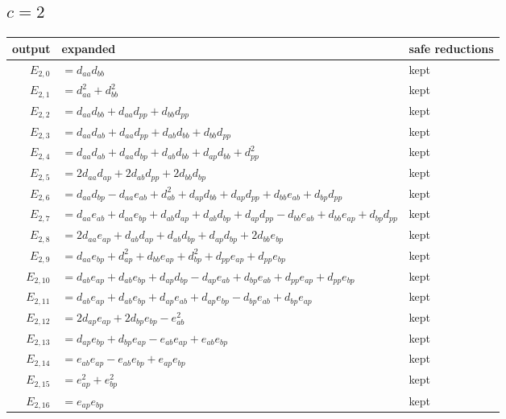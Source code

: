 \documentclass[10pt]{article}
\begin{document}
\subsection*{$c = 2$}
\begin{longtable}{r>{\raggedright\arraybackslash}p{}>{\raggedright\arraybackslash}p{}}
output & expanded & safe reductions \\ \hline
$E_{2,0}$ & $= d_{aa} d_{bb}$ & kept \\
$E_{2,1}$ & $= d_{aa}^{2} + d_{bb}^{2}$ & kept \\
$E_{2,2}$ & $= d_{aa} d_{bb} + d_{aa} d_{pp} + d_{bb} d_{pp}$ & kept \\
$E_{2,3}$ & $= d_{aa} d_{ab} + d_{aa} d_{pp} + d_{ab} d_{bb} + d_{bb} d_{pp}$ & kept \\
$E_{2,4}$ & $= d_{aa} d_{ab} + d_{aa} d_{bp} + d_{ab} d_{bb} + d_{ap} d_{bb} + d_{pp}^{2}$ & kept \\
$E_{2,5}$ & $= 2 d_{aa} d_{ap} + 2 d_{ab} d_{pp} + 2 d_{bb} d_{bp}$ & kept \\
$E_{2,6}$ & $= d_{aa} d_{bp} - d_{aa} e_{ab} + d_{ab}^{2} + d_{ap} d_{bb} + d_{ap} d_{pp} + d_{bb} e_{ab} + d_{bp} d_{pp}$ & kept \\
$E_{2,7}$ & $= d_{aa} e_{ab} + d_{aa} e_{bp} + d_{ab} d_{ap} + d_{ab} d_{bp} + d_{ap} d_{pp} - d_{bb} e_{ab} + d_{bb} e_{ap} + d_{bp} d_{pp}$ & kept \\
$E_{2,8}$ & $= 2 d_{aa} e_{ap} + d_{ab} d_{ap} + d_{ab} d_{bp} + d_{ap} d_{bp} + 2 d_{bb} e_{bp}$ & kept \\
$E_{2,9}$ & $= d_{aa} e_{bp} + d_{ap}^{2} + d_{bb} e_{ap} + d_{bp}^{2} + d_{pp} e_{ap} + d_{pp} e_{bp}$ & kept \\
$E_{2,10}$ & $= d_{ab} e_{ap} + d_{ab} e_{bp} + d_{ap} d_{bp} - d_{ap} e_{ab} + d_{bp} e_{ab} + d_{pp} e_{ap} + d_{pp} e_{bp}$ & kept \\
$E_{2,11}$ & $= d_{ab} e_{ap} + d_{ab} e_{bp} + d_{ap} e_{ab} + d_{ap} e_{bp} - d_{bp} e_{ab} + d_{bp} e_{ap}$ & kept \\
$E_{2,12}$ & $= 2 d_{ap} e_{ap} + 2 d_{bp} e_{bp} - e_{ab}^{2}$ & kept \\
$E_{2,13}$ & $= d_{ap} e_{bp} + d_{bp} e_{ap} - e_{ab} e_{ap} + e_{ab} e_{bp}$ & kept \\
$E_{2,14}$ & $= e_{ab} e_{ap} - e_{ab} e_{bp} + e_{ap} e_{bp}$ & kept \\
$E_{2,15}$ & $= e_{ap}^{2} + e_{bp}^{2}$ & kept \\
$E_{2,16}$ & $= e_{ap} e_{bp}$ & kept \\
\end{longtable}
\end{document}
